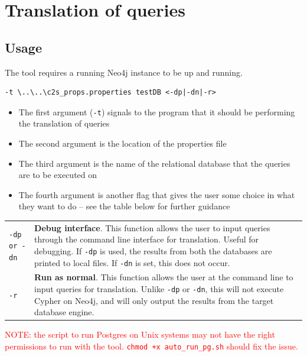 \documentclass[letterpaper]{ltxdoc}
\begin{document}
\section{Translation of queries}
\label{sec:tranQ}
\subsection{Usage}
The tool requires a running Neo4j instance to be up and running.

\medskip

\begin{verbatim}
-t \..\..\c2s_props.properties testDB <-dp|-dn|-r>
\end{verbatim}

\medskip

\begin{itemize}
\item The first argument (\texttt{-t}) signals to the program that it should be performing the translation of queries
\item The second argument is the location of the properties file
\item The third argument is the name of the relational database that the queries are to be executed on
\item The fourth argument is another flag that gives the user some choice in what they want to do -- see the table below for further guidance
\end{itemize}

\begin{center}
\begin{tabular}{ p{2cm} p{11.5cm} }
\texttt{-dp or -dn} & \textbf{Debug interface}. This function allows the user to input queries through the command line interface for translation. Useful for debugging. If \texttt{-dp} is used, the results from both the databases are printed to local files. If \texttt{-dn} is set, this does not occur. \\

\texttt{-r} & \textbf{Run as normal}. This function allows the user at the command line to input queries for translation. Unlike \texttt{-dp} or \texttt{-dn}, this will not execute Cypher on Neo4j, and will only output the results from the target database engine.
\end{tabular}
\end{center}

\medskip

\textcolor{red}{NOTE: the script to run Postgres on Unix systems may not have the right permissions to run with the tool. \texttt{chmod +x auto\_run\_pg.sh} should fix the issue.}
\end{document}
